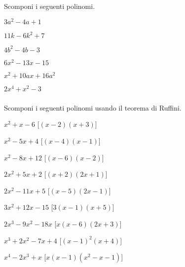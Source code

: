 \begin{esercizio}
 \label{ese:17.10}
 Scomponi i seguenti polinomi.
\begin{multicols}{3}
 \begin{enumeratea}
 \item \(3a^{{2}}-4a+1\)
 \item \(11k-6k^{2}+7\)
 \item \(4b^{{2}}-4b-3\)
 \item \(6x^{2}-13x-15\)
 \item \(x^{2}+10ax+16a^{2}\)
 \item \(2x^{{4}}+x^{{2}}-3\)
 \end{enumeratea}
\end{multicols}
 \end{esercizio}

\subsubsection*{}

\begin{esercizio}\label{ese:}
 Scomponi i seguenti polinomi usando il teorema di Ruffini.
\begin{multicols}{2}
 \begin{enumeratea}
\item \(x^{2} + x - 6\)
  \hfill [\(\left(x - 2\right) \left(x + 3\right)\)]
\item \(x^{2} - 5 x + 4\)
  \hfill [\(\left(x - 4\right) \left(x - 1\right)\)]
\item \(x^{2} - 8 x + 12\)
  \hfill [\(\left(x - 6\right) \left(x - 2\right)\)]
\item \(2 x^{2} + 5 x + 2\)
  \hfill [\(\left(x + 2\right) \left(2 x + 1\right)\)]
\item \(2 x^{2} - 11 x + 5\)
  \hfill [\(\left(x - 5\right) \left(2 x - 1\right)\)]
\item \(3 x^{2} + 12 x - 15\)
  \hfill [\(3 \left(x - 1\right) \left(x + 5\right)\)]
\item \(2 x^{3} - 9 x^{2} - 18 x\)
  \hfill [\(x \left(x - 6\right) \left(2 x + 3\right)\)]
\item \(x^{3} + 2 x^{2} - 7 x + 4\)
  \hfill [\(\left(x - 1\right)^{2} \left(x + 4\right)\)]
\item \(x^{4} - 2 x^{3} + x\)
  \hfill [\(x \left(x - 1\right) \left(x^{2} - x - 1\right)\)]
 \end{enumeratea}
\end{multicols}
\end{esercizio}

